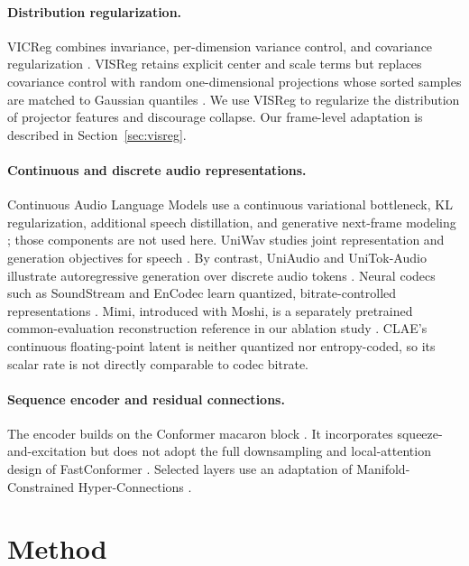 \documentclass[11pt,a4paper]{article}
\begin{document}
\paragraph{Distribution regularization.}
VICReg combines invariance, per-dimension variance control, and covariance regularization \citep{bardes2022vicreg}. VISReg retains explicit center and scale terms but replaces covariance control with random one-dimensional projections whose sorted samples are matched to Gaussian quantiles \citep{wu2026visreg}. We use VISReg to regularize the distribution of projector features and discourage collapse. Our frame-level adaptation is described in Section~\ref{sec:visreg}.

\paragraph{Continuous and discrete audio representations.}
Continuous Audio Language Models use a continuous variational bottleneck, KL regularization, additional speech distillation, and generative next-frame modeling \citep{rouard2025calm}; those components are not used here. UniWav studies joint representation and generation objectives for speech \citep{liu2025uniwav}. By contrast, UniAudio and UniTok-Audio illustrate autoregressive generation over discrete audio tokens \citep{yang2024uniaudio,liu2025unitokaudio}. Neural codecs such as SoundStream and EnCodec learn quantized, bitrate-controlled representations \citep{zeghidour2021soundstream,defossez2023encodec}. Mimi, introduced with Moshi, is a separately pretrained common-evaluation reconstruction reference in our ablation study \citep{defossez2024moshi}. CLAE's continuous floating-point latent is neither quantized nor entropy-coded, so its scalar rate is not directly comparable to codec bitrate.

\paragraph{Sequence encoder and residual connections.}
The encoder builds on the Conformer macaron block \citep{gulati2020conformer}. It incorporates squeeze-and-excitation but does not adopt the full downsampling and local-attention design of FastConformer \citep{rekesh2023fastconformer}. Selected layers use an adaptation of Manifold-Constrained Hyper-Connections \citep{xie2025mhc}.

\section{Method}
\end{document}
